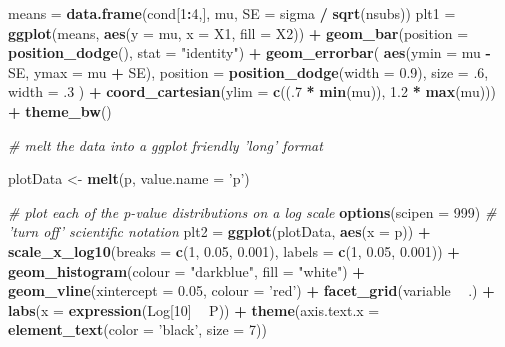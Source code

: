 \documentclass[]{book}
\newenvironment{Shaded}{\begin{snugshade}}{\end{snugshade}}
\newcommand{\CommentTok}[1]{\textcolor[rgb]{0.56,0.35,0.01}{\textit{#1}}}
\newcommand{\DataTypeTok}[1]{\textcolor[rgb]{0.13,0.29,0.53}{#1}}
\newcommand{\DecValTok}[1]{\textcolor[rgb]{0.00,0.00,0.81}{#1}}
\newcommand{\FloatTok}[1]{\textcolor[rgb]{0.00,0.00,0.81}{#1}}
\newcommand{\KeywordTok}[1]{\textcolor[rgb]{0.13,0.29,0.53}{\textbf{#1}}}
\newcommand{\NormalTok}[1]{#1}
\newcommand{\OperatorTok}[1]{\textcolor[rgb]{0.81,0.36,0.00}{\textbf{#1}}}
\newcommand{\StringTok}[1]{\textcolor[rgb]{0.31,0.60,0.02}{#1}}
\begin{document}
\begin{Shaded}
\begin{Highlighting}[]
\NormalTok{means =}\StringTok{ }\KeywordTok{data.frame}\NormalTok{(cond[}\DecValTok{1}\OperatorTok{:}\DecValTok{4}\NormalTok{,], mu, }\DataTypeTok{SE =}\NormalTok{ sigma }\OperatorTok{/}\StringTok{ }\KeywordTok{sqrt}\NormalTok{(nsubs))}
\NormalTok{plt1 =}\StringTok{ }\KeywordTok{ggplot}\NormalTok{(means, }\KeywordTok{aes}\NormalTok{(}\DataTypeTok{y =}\NormalTok{ mu, }\DataTypeTok{x =}\NormalTok{ X1, }\DataTypeTok{fill =}\NormalTok{ X2)) }\OperatorTok{+}
\KeywordTok{geom_bar}\NormalTok{(}\DataTypeTok{position =} \KeywordTok{position_dodge}\NormalTok{(), }\DataTypeTok{stat =} \StringTok{"identity"}\NormalTok{) }\OperatorTok{+}
\KeywordTok{geom_errorbar}\NormalTok{(}
\KeywordTok{aes}\NormalTok{(}\DataTypeTok{ymin =}\NormalTok{ mu }\OperatorTok{-}\StringTok{ }\NormalTok{SE, }\DataTypeTok{ymax =}\NormalTok{ mu }\OperatorTok{+}\StringTok{ }\NormalTok{SE),}
\DataTypeTok{position =} \KeywordTok{position_dodge}\NormalTok{(}\DataTypeTok{width =} \FloatTok{0.9}\NormalTok{),}
\DataTypeTok{size =} \FloatTok{.6}\NormalTok{,}
\DataTypeTok{width =} \FloatTok{.3}
\NormalTok{) }\OperatorTok{+}
\KeywordTok{coord_cartesian}\NormalTok{(}\DataTypeTok{ylim =} \KeywordTok{c}\NormalTok{((.}\DecValTok{7} \OperatorTok{*}\StringTok{ }\KeywordTok{min}\NormalTok{(mu)), }\FloatTok{1.2} \OperatorTok{*}\StringTok{ }\KeywordTok{max}\NormalTok{(mu))) }\OperatorTok{+}
\KeywordTok{theme_bw}\NormalTok{()}
 
\CommentTok{# melt the data into a ggplot friendly 'long' format}

\NormalTok{plotData <-}\StringTok{ }\KeywordTok{melt}\NormalTok{(p, }\DataTypeTok{value.name =} \StringTok{'p'}\NormalTok{)}
 
\CommentTok{# plot each of the p-value distributions on a log scale}
\KeywordTok{options}\NormalTok{(}\DataTypeTok{scipen =} \DecValTok{999}\NormalTok{) }\CommentTok{# 'turn off' scientific notation}
\NormalTok{plt2 =}\StringTok{ }\KeywordTok{ggplot}\NormalTok{(plotData, }\KeywordTok{aes}\NormalTok{(}\DataTypeTok{x =}\NormalTok{ p)) }\OperatorTok{+}
\KeywordTok{scale_x_log10}\NormalTok{(}\DataTypeTok{breaks =} \KeywordTok{c}\NormalTok{(}\DecValTok{1}\NormalTok{, }\FloatTok{0.05}\NormalTok{, }\FloatTok{0.001}\NormalTok{),}
\DataTypeTok{labels =} \KeywordTok{c}\NormalTok{(}\DecValTok{1}\NormalTok{, }\FloatTok{0.05}\NormalTok{, }\FloatTok{0.001}\NormalTok{)) }\OperatorTok{+}
\KeywordTok{geom_histogram}\NormalTok{(}\DataTypeTok{colour =} \StringTok{"darkblue"}\NormalTok{, }\DataTypeTok{fill =} \StringTok{"white"}\NormalTok{) }\OperatorTok{+}
\KeywordTok{geom_vline}\NormalTok{(}\DataTypeTok{xintercept =} \FloatTok{0.05}\NormalTok{, }\DataTypeTok{colour =} \StringTok{'red'}\NormalTok{) }\OperatorTok{+}
\KeywordTok{facet_grid}\NormalTok{(variable }\OperatorTok{~}\StringTok{ }\NormalTok{.) }\OperatorTok{+}
\KeywordTok{labs}\NormalTok{(}\DataTypeTok{x =} \KeywordTok{expression}\NormalTok{(Log[}\DecValTok{10}\NormalTok{] }\OperatorTok{~}\StringTok{ }\NormalTok{P)) }\OperatorTok{+}
\KeywordTok{theme}\NormalTok{(}\DataTypeTok{axis.text.x =} \KeywordTok{element_text}\NormalTok{(}\DataTypeTok{color =} \StringTok{'black'}\NormalTok{, }\DataTypeTok{size =} \DecValTok{7}\NormalTok{))}


\end{Highlighting}
\end{Shaded}
\end{document}
